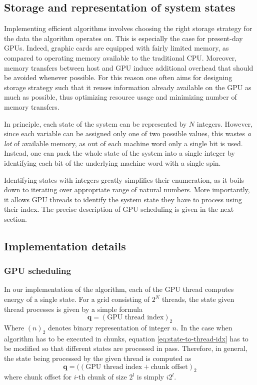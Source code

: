 \subsection{Storage and representation of system states}
Implementing efficient algorithms involves choosing the right storage strategy for the data the algorithm operates on. This is especially the case for present-day GPUs. Indeed, graphic cards are equipped with fairly limited memory, as compared to operating memory available to the traditional CPU. Moreover, memory transfers between host and GPU induce additional overhead that should be avoided whenever possible. For this reason one often aims for designing storage strategy such that it reuses information already available on the GPU as much as possible, thus optimizing resource usage and minimizing number of memory transfers.

In principle, each state of the system can be represented by $N$ integers. However, since each variable can be assigned only one of two possible values, this wastes \emph{a lot} of available memory, as out of each machine word only a single bit is used. Instead, one can pack the whole state of the system into a single integer by identifying each bit of the underlying machine word with a single spin. 

Identifying states with integers greatly simplifies their enumeration, as it boils down to iterating over appropriate range of natural numbers. More importantly, it allows GPU threads to identify the system state they have to process using their index. The precise description of GPU scheduling is given in the next section.

\subsection{Implementation details}
\subsubsection{GPU scheduling}
In our implementation of the algorithm, each of the GPU thread computes energy of a single state. For a grid consisting of $2^N$ threads, the state given thread processes is given by a simple formula
\begin{equation}
\label{eq:state-to-thread-idx}
    \mathbf{q} = (\mbox{GPU thread index})_2
\end{equation}
Where $(n)_2$ denotes binary representation of integer $n$. In the case when algorithm has to be executed in chunks, equation \eqref{eq:state-to-thread-idx} has to be modified so that different states are processed in pass. Therefore, in general, the state being processed by the given thread is computed as
\begin{equation}
\mathbf{q} = ((\mbox{GPU thread index} + \mbox{chunk offset})_2
\end{equation}
where chunk offset for $i$-th chunk of size $2^l$ is simply $i2^l$.

